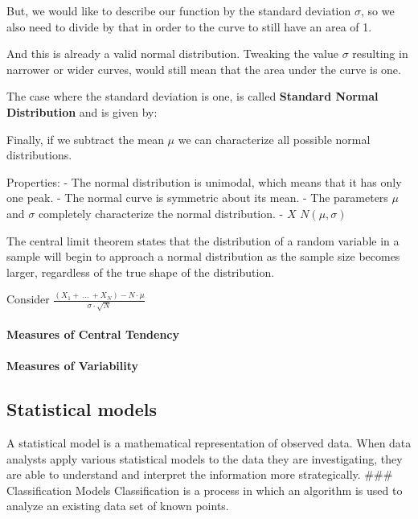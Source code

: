\documentclass[11pt]{article}
\begin{document}
But, we would like to describe our function by the standard deviation
\(\sigma\), so we also need to divide by that in order to the curve to
still have an area of 1.

And this is already a valid normal distribution. Tweaking the value
\(\sigma\) resulting in narrower or wider curves, would still mean that
the area under the curve is one.

The case where the standard deviation is one, is called \textbf{Standard
Normal Distribution} and is given by:


Finally, if we subtract the mean \(\mu\) we can characterize all
possible normal distributions.


Properties: - The normal distribution is unimodal, which means that it
has only one peak. - The normal curve is symmetric about its mean. - The
parameters \(\mu\) and \(\sigma\) completely characterize the normal
distribution. - \(X \text{~} N(\mu,\sigma)\)


The central limit theorem states that the distribution of a random
variable in a sample will begin to approach a normal distribution as the
sample size becomes larger, regardless of the true shape of the
distribution.

Consider
\(\frac{(X_1 + \ ... \ +X_N ) - N \cdot \mu}{\sigma \cdot \sqrt{N}}\)


\hypertarget{measures-of-central-tendency}{%
\paragraph{Measures of Central
Tendency}\label{measures-of-central-tendency}}

\hypertarget{measures-of-variability}{%
\paragraph{Measures of Variability}\label{measures-of-variability}}

    \hypertarget{statistical-models}{%
\subsection{Statistical models}\label{statistical-models}}

A statistical model is a mathematical representation of observed data.
When data analysts apply various statistical models to the data they are
investigating, they are able to understand and interpret the information
more strategically. \#\#\# Classification Models Classification is a
process in which an algorithm is used to analyze an existing data set of
known points.
\end{document}
